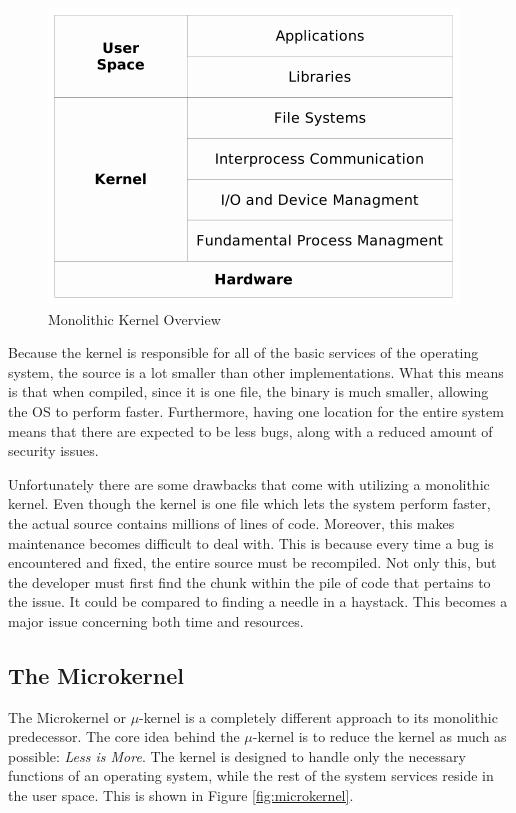 \documentclass[12pt]{article}
\begin{document}
\begin{figure}[h!]
\centering
\includegraphics[width=\linewidth]{pictures/monolithic}
\caption{Monolithic Kernel Overview\cite{Vs}}
\label{fig:monolithic}
\end{figure}


Because the kernel is responsible for all of the basic services of the operating system, the source is a lot smaller than other implementations. What this means is that when compiled, since it is one file, the binary is much smaller, allowing the OS to perform faster. Furthermore, having one location for the entire system means that there are expected to be less bugs, along with a reduced amount of security issues. 

Unfortunately there are some drawbacks that come with utilizing a monolithic kernel. Even though the kernel is one file which lets the system perform faster, the actual source contains millions of lines of code. Moreover, this makes maintenance becomes difficult to deal with. This is because every time a bug is encountered and fixed, the entire source must be recompiled. Not only this, but the developer must first find the chunk within the pile of code that pertains to the issue. It could be compared to finding a needle in a haystack. This becomes a major issue concerning both time and resources.
\subsection{The Microkernel}
The Microkernel or $\mu$-kernel is a completely different approach to its monolithic predecessor. The core idea behind the $\mu$-kernel is to reduce the kernel as much as possible: \emph{Less is More}. The kernel is designed to handle only the necessary functions of an operating system, while the rest of the system services reside in the user space. This is shown in Figure \ref{fig:microkernel}.
\end{document}
